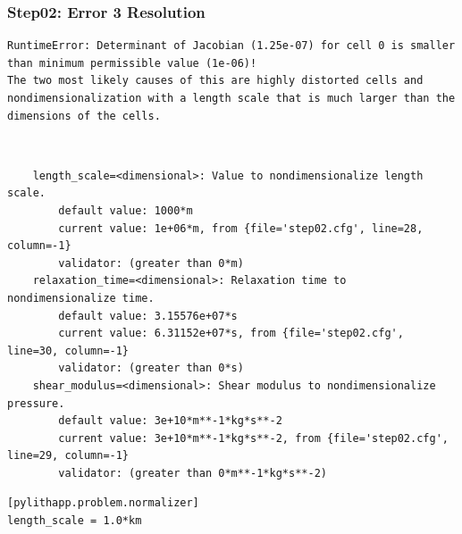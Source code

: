 \documentclass{beamer}
\begin{document}
\begin{frame}[fragile]
  \frametitle{Step02: Error 3 Resolution}

\begin{lstlisting}
RuntimeError: Determinant of Jacobian (1.25e-07) for cell 0 is smaller than minimum permissible value (1e-06)!
The two most likely causes of this are highly distorted cells and nondimensionalization with a length scale that is much larger than the dimensions of the cells.
\end{lstlisting}\pause
{} \\
\begin{lstlisting}
    length_scale=<dimensional>: Value to nondimensionalize length scale.
        default value: 1000*m
        current value: 1e+06*m, from {file='step02.cfg', line=28, column=-1}
        validator: (greater than 0*m)
    relaxation_time=<dimensional>: Relaxation time to nondimensionalize time.
        default value: 3.15576e+07*s
        current value: 6.31152e+07*s, from {file='step02.cfg', line=30, column=-1}
        validator: (greater than 0*s)
    shear_modulus=<dimensional>: Shear modulus to nondimensionalize pressure.
        default value: 3e+10*m**-1*kg*s**-2
        current value: 3e+10*m**-1*kg*s**-2, from {file='step02.cfg', line=29, column=-1}
        validator: (greater than 0*m**-1*kg*s**-2)
\end{lstlisting}\pause
{}
\begin{lstlisting}
[pylithapp.problem.normalizer]
length_scale = 1.0*km
\end{lstlisting}

\end{frame}
\end{document}
